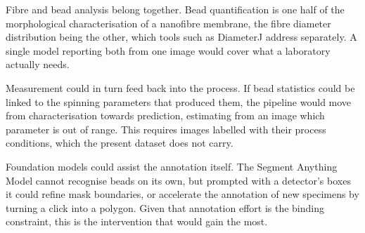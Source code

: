 Fibre and bead analysis belong together. Bead quantification is one half of the
morphological characterisation of a nanofibre membrane, the fibre diameter distribution
being the other, which tools such as DiameterJ \cite{hotaling2015diameterj}
address separately. A single model reporting both from one image would cover
what a laboratory actually needs.

Measurement could in turn feed back into the process. If bead statistics could be
linked
to the spinning parameters that produced them, the pipeline would move from
characterisation towards prediction, estimating from an image which parameter
is out of range. This requires images labelled with their process conditions,
which the present dataset does not carry.

Foundation models could assist the annotation itself. The Segment Anything Model
\cite{kirillov2023segment} cannot recognise beads on its own, but prompted with a
detector's boxes it could refine mask boundaries, or accelerate the annotation of
new specimens by turning a click into a polygon. Given that annotation effort is
the binding constraint, this is the intervention that would gain the most.
